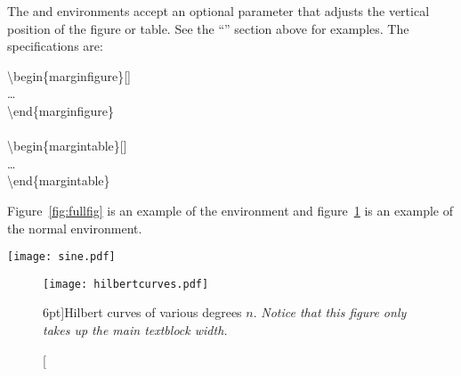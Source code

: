 The  and  environments accept an optional parameter  that adjusts the vertical position of the figure or table.  See the ``'' section above for examples.  The specifications are:
\begin{docspec}
  \textbackslash{begin\{marginfigure\}[]}\\
  \qquad\ldots\\
  \textbackslash{end\{marginfigure\}}\\
  \mbox{}\\
  \textbackslash{begin\{margintable\}[]}\\
  \qquad\ldots\\
  \textbackslash{end\{margintable\}}\\
\end{docspec}

Figure~\ref{fig:fullfig} is an example of the 
environment and figure~\ref{fig:textfig} is an example of the normal
 environment.

\begin{figure*}[h]
  \texttt{[image: sine.pdf]}%
  \caption{This graph shows $y = \sin x$ from about $x = [-10, 10]$.
  \emph{Notice that this figure takes up the full page width.}}%
  \label{fig:fullfig}%
\end{figure*}

\begin{figure}
  \texttt{[image: hilbertcurves.pdf]}
  \caption[Hilbert curves of various degrees $n$.][6pt]{Hilbert curves of various degrees $n$. \emph{Notice that this figure only takes up the main textblock width.}}
  \label{fig:textfig}
\end{figure}

